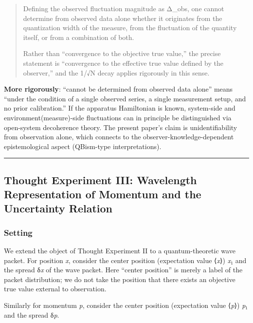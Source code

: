 \documentclass[
  11pt,
]{article}
\begin{document}
\begin{quote}
Defining the observed fluctuation magnitude as Δ\_obs, one cannot
determine from observed data alone whether it originates from the
quantization width of the measure, from the fluctuation of the quantity
itself, or from a combination of both.

Rather than ``convergence to the objective true value,'' the precise
statement is ``convergence to the effective true value defined by the
observer,'' and the 1/√N decay applies rigorously in this sense.
\end{quote}

\textbf{More rigorously}: ``cannot be determined from observed data
alone'' means ``under the condition of a single observed series, a
single measurement setup, and no prior calibration.'' If the apparatus
Hamiltonian is known, system-side and environment(measure)-side
fluctuations can in principle be distinguished via open-system
decoherence theory. The present paper's claim is unidentifiability from
observation alone, which connects to the observer-knowledge-dependent
epistemological aspect (QBism-type interpretations).

\begin{center}\rule{0.5\linewidth}{0.5pt}\end{center}

\subsection{Thought Experiment III: Wavelength Representation of
Momentum and the Uncertainty
Relation}\label{thought-experiment-iii-wavelength-representation-of-momentum-and-the-uncertainty-relation}

\subsubsection{Setting}\label{setting-2}

We extend the object of Thought Experiment II to a quantum-theoretic
wave packet. For position \emph{x}, consider the center position
(expectation value ⟨\emph{x}⟩) \emph{x}₁ and the spread δ\emph{x} of the
wave packet. Here ``center position'' is merely a label of the packet
distribution; we do not take the position that there exists an objective
true value external to observation.

Similarly for momentum \emph{p}, consider the center position
(expectation value ⟨\emph{p}⟩) \emph{p}₁ and the spread δ\emph{p}.
\end{document}
